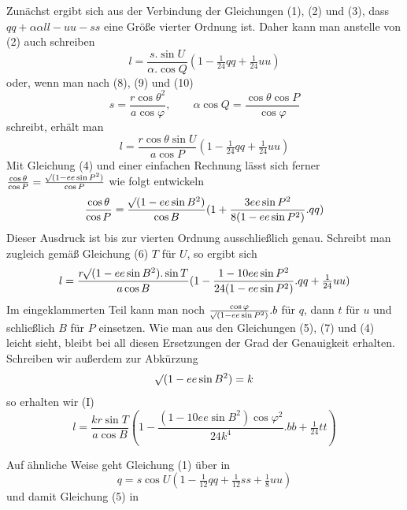 %
\par\noindent\hspace*{\parindent} Zunächst ergibt sich aus der Verbindung der Gleichungen (1), (2) und (3), dass \(qq+\alpha\alpha ll-uu-ss\) eine Größe vierter Ordnung ist. Daher kann man anstelle von (2) auch schreiben
\[
l=\frac{s\mathord{.}\sin U}{\alpha\mathord{.}\cos Q}(1-\tfrac1{24}qq+\tfrac1{24}uu)
\]
oder, wenn man nach (8), (9) und (10)
\[
s=\frac{r\cos\theta^2}{a\cos\varphi},\qquad \alpha\cos Q=\frac{\cos\theta\cos P}{\cos\varphi}
\]
schreibt, erhält man
\[
l=\frac{r\cos\theta\sin U}{a\cos P}(1-\tfrac1{24}qq+\tfrac1{24}uu)
\]
Mit Gleichung (4) und einer einfachen Rechnung lässt sich ferner \(\frac{\cos\theta}{\cos P}=\frac{\mathord{{}^{}\!\surd}(1-ee\sin P^2)}{\cos P}\) wie folgt entwickeln
\[
\frac{\cos\theta}{\cos P}=\frac{\mathord{{}^{}\!\surd}(1-ee\sin B^2)}{\cos B}(1+\frac{3ee\sin P^2}{8(1-ee\sin P^2)}\mathord{.}qq)
\]
Dieser Ausdruck ist bis zur vierten Ordnung ausschließlich genau. Schreibt man zugleich gemäß Gleichung (6) \(T\) für \(U\), so ergibt sich
\[
l=\frac{r\mathord{{}^{}\!\surd}(1-ee\sin B^2)\mathord{.}\sin T}{a\cos B}(1-\frac{1-10ee\sin P^2}{24(1-ee\sin P^2)}\mathord{.}qq+\tfrac1{24}uu)
\]
Im eingeklammerten Teil kann man noch \(\frac{\cos\varphi}{\mathord{{}^{}\!\surd}(1-ee\sin P^2)}\mathord{.}b\) für \(q\), dann \(t\) für \(u\) und schließlich \(B\) für \(P\) einsetzen. Wie man aus den Gleichungen (5), (7) und (4) leicht sieht, bleibt bei all diesen Ersetzungen der Grad der Genauigkeit erhalten. Schreiben wir außerdem zur Abkürzung
\[
\mathord{{}^{}\!\surd}(1-ee\sin B^2)=k
\]
so erhalten wir (I)
\[
l=\frac{kr\sin T}{a\cos B}(1-\frac{(1-10ee\sin B^2)\cos\varphi^2}{24k^4}\mathord{.}bb+\tfrac1{24}tt)
\]

Auf ähnliche Weise geht Gleichung (1) über in
\[
q=s\cos U(1-\tfrac1{12}qq+\tfrac1{12}ss+\tfrac18uu)
\]
und damit Gleichung (5) in
